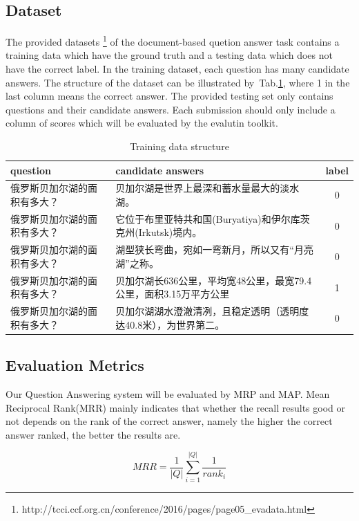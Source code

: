 \documentclass{llncs}
\begin{document}
\subsection{Dataset}

The provided datasets \footnote{ http://tcci.ccf.org.cn/conference/2016/pages/page05\_evadata.html} of the document-based quetion answer task contains a training data which have the ground truth and a testing data which does not have the correct label. In the training dataset, each question has many candidate answers. The structure of the dataset can be illustrated by~Tab.\ref{tab:table1}, where 1 in the last column means the correct answer. The provided testing set only contains questions and their candidate answers. Each submission should only include a column of scores which will be evaluated by the evalutin toolkit.  


\begin{table}[!hbp]
\caption{Training data structure}
\scriptsize
\label{tab:table1}
\begin{tabular}{|l|l|c|}
 \hline
question & candidate answers & label \\ \hline
俄罗斯贝加尔湖的面积有多大？& 贝加尔湖是世界上最深和蓄水量最大的淡水湖。& 0 \\
\hline
俄罗斯贝加尔湖的面积有多大？& 它位于布里亚特共和国(Buryatiya)和伊尔库茨克州(Irkutsk)境内。&0\\
\hline
俄罗斯贝加尔湖的面积有多大？& 湖型狭长弯曲，宛如一弯新月，所以又有“月亮湖”之称。&0\\
\hline
俄罗斯贝加尔湖的面积有多大？& 贝加尔湖长636公里，平均宽48公里，最宽79.4公里，面积3.15万平方公里& 1\\
\hline
俄罗斯贝加尔湖的面积有多大？& 贝加尔湖湖水澄澈清冽，且稳定透明（透明度达40.8米），为世界第二。&0\\
\hline
\end{tabular}

\end{table}

\subsection{Evaluation Metrics}
Our Question Answering system will be evaluated by MRP and MAP. Mean Reciprocal Rank(MRR) mainly indicates that whether the recall results good or not depends on the rank of the correct answer, namely the higher the correct answer ranked, the better the results are.

\begin{equation}
MRR=\frac{1}{|Q|}\sum_{i=1}^{|Q|}\frac{1}{rank_{i}}
\end{equation}
\end{document}
